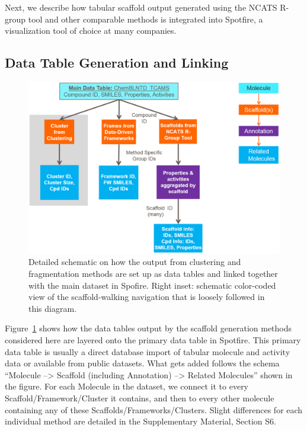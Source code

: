 \documentclass[journal=jacsat,manuscript=article]{achemso}
\newcommand*\fref[1]{Figure~\ref{fig:#1}}
\begin{document}
Next, we describe how tabular scaffold output generated using the
NCATS R-group tool and other comparable methods is integrated into
Spotfire, a visualization tool of choice at many companies. 

\subsection{Data Table Generation and Linking}

\begin{figure}
\includegraphics[width=6in]{fig/details_all3_noSNG.png}
\caption{Detailed schematic on how the output from clustering and
  fragmentation methods are set up as data tables and linked together
  with the main dataset in Spofire. Right inset: schematic color-coded
  view of the scaffold-walking navigation that is loosely followed in
  this diagram.}
\label{fig:detaildevil}
\end{figure}

\fref{detaildevil} shows how the data tables output by the scaffold
generation methods considered here are layered onto the primary data
table in Spotfire. This primary data table is usually a direct database
import of tabular molecule and activity data or available from public
datasets. What gets added follows the schema ``Molecule --> Scaffold (including Annotation)
--> Related Molecules'' shown in the figure. For each Molecule in the
dataset, we connect it to every Scaffold/Framework/Cluster it
contains, and then to every other molecule containing any of these
Scaffolds/Frameworks/Clusters. Slight differences for each individual
method are detailed in the Supplementary Material, Section S6.
\end{document}
